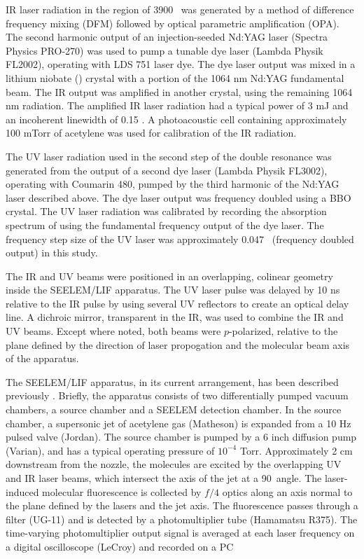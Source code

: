 IR laser radiation in the region of 3900 \rcm\ was generated by a
method of difference frequency mixing (DFM) followed by optical
parametric amplification (OPA).  The second harmonic output of an
injection-seeded Nd:YAG laser (Spectra Physics PRO-270) was used to
pump a tunable dye laser (Lambda Physik FL2002), operating with LDS
751 laser dye.  The dye laser output was mixed in a lithium niobate
() crystal with a portion of the 1064 nm Nd:YAG fundamental
beam.  The IR output was amplified in another  crystal,
using the remaining 1064 nm radiation.  The amplified IR laser
radiation had a typical power of 3 mJ and an incoherent linewidth of
0.15 \rcm.  A photoacoustic cell containing approximately 100 mTorr of
acetylene was used for calibration of the IR radiation.

The UV laser radiation used in the second step of the double resonance
was generated from the output of a second dye laser (Lambda Physik
FL3002), operating with Coumarin 480, pumped by the third harmonic of
the Nd:YAG laser described above.  The dye laser output was frequency
doubled using a BBO crystal.  The UV laser radiation was calibrated by
recording the absorption spectrum of  using the fundamental
frequency output of the dye laser.  The frequency step size of the UV
laser was approximately 0.047 \rcm\ (frequency doubled output) in this
study.

The IR and UV beams were positioned in an overlapping, colinear
geometry inside the SEELEM/LIF apparatus.  The UV laser pulse was
delayed by 10 ns relative to the IR pulse by using several UV
reflectors to create an optical delay line.  A dichroic mirror,
transparent in the IR, was used to combine the IR and UV beams.
Except where noted, both beams were $p$-polarized, relative to the
plane defined by the direction of laser propogation and the molecular
beam axis of the apparatus.

The SEELEM/LIF apparatus, in its current arrangement, has been
described previously \cite{cunningham-thesis, altunata-thesis,
  altunata02, mishra04}.  Briefly, the apparatus consists
of two differentially pumped vacuum chambers, a source chamber and a
SEELEM detection chamber.  In the source chamber, a supersonic jet of
acetylene gas (Matheson) is expanded from a 10 Hz pulsed valve
(Jordan).  The source chamber is pumped by a 6 inch diffusion pump
(Varian), and has a typical operating pressure of $10^{-4}$ Torr.
Approximately 2 cm downstream from the nozzle, the molecules are
excited by the overlapping UV and IR laser beams, which intersect the
axis of the jet at a 90\degrees\ angle.  The laser-induced molecular
fluorescence is collected by $f/4$ optics along an axis normal to the
plane defined by the lasers and the jet axis.  The fluorescence passes
through a filter (UG-11) and is detected by a photomultiplier tube
(Hamamatsu R375).  The time-varying photomultiplier output signal is
averaged at each laser frequency on a digital oscilloscope (LeCroy)
and recorded on a PC %

